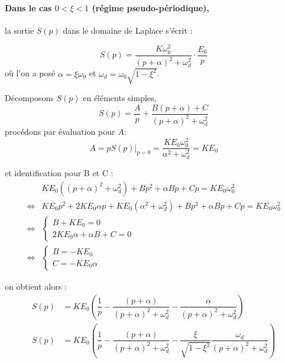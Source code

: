 \paragraph{Dans le cas $0<\xi<1$ (régime pseudo-périodique),} 
la sortie $S(p)$ dans le domaine de Laplace s'écrit :

$$
S(p)=\dfrac{K\omega^2_0}{(p+\alpha)^2+\omega^2_d}\cdot\dfrac{E_0}{p}
$$
où l'on a posé $\alpha=\xi\omega_0$ et $\omega_d=\omega_0\sqrt{1-\xi^2}$.

Décomposons $S(p)$ en éléments simples,
$$
S(p)=\dfrac{A}{p} + \dfrac{B(p+\alpha)+C}{(p+\alpha)^2+\omega^2_d}
$$
procédons par évaluation pour $A$:
$$
A=pS(p)\Big|_{p=0}=\dfrac{KE_0\omega^2_0}{\alpha^2+\omega^2_d}=KE_0
$$

et identification pour B et C :
\begin{align*}
    &KE_0((p+\alpha)^2+\omega^2_d) + Bp^2+\alpha Bp+Cp = KE_0\omega^2_0 \\
    \iff & KE_0p^2+2KE_0\alpha p+KE_0(\alpha^2+\omega^2_d) + Bp^2+\alpha Bp+Cp 
    = KE_0\omega^2_0 \\ 
\iff & 
\begin{cases}
      B+KE_0 = 0 \\ 
      2KE_0\alpha+\alpha B+C=0
\end{cases} \\
\iff & \begin{cases}
      B=-KE_0     \\
      C=-KE_0\alpha
  \end{cases}
\end{align*}

on obtient alors :
\begin{align*}
    S(p)&=KE_0\left(\dfrac{1}{p} - 
          \dfrac{(p+\alpha)}{(p+\alpha)^2+\omega^2_d} - 
          \dfrac{\alpha}{(p+\alpha)^2+\omega^2_d}\right) \\
    S(p)&=KE_0\left(\dfrac{1}{p} - 
          \dfrac{(p+\alpha)}{(p+\alpha)^2+\omega^2_d} - 
          \dfrac{\xi}{\sqrt{1-\xi^2}} 
          \dfrac{\omega_d}{(p+\alpha)^2+\omega^2_d}\right)
\end{align*}

